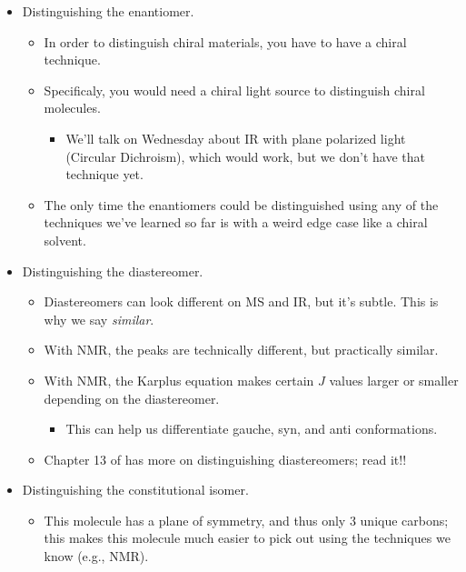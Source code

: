 \documentclass[../notes.tex]{subfiles}
\begin{document}
\begin{itemize}
\begin{itemize}
        \item Distinguishing the enantiomer.
        \begin{itemize}
            \item In order to distinguish chiral materials, you have to have a chiral technique.
            \item Specificaly, you would need a chiral light source to distinguish chiral molecules.
            \begin{itemize}
                \item We'll talk on Wednesday about IR with plane polarized light (Circular Dichroism), which would work, but we don't have that technique yet.
            \end{itemize}
            \item The only time the enantiomers could be distinguished using any of the techniques we've learned so far is with a weird edge case like a chiral solvent.
        \end{itemize}
        \item Distinguishing the diastereomer.
        \begin{itemize}
            \item Diastereomers can look different on MS and IR, but it's subtle. This is why we say \emph{similar}.
            \item With  NMR, the peaks are technically different, but practically similar.
            \item With  NMR, the Karplus equation makes certain $J$ values larger or smaller depending on the diastereomer.
            \begin{itemize}
                \item This can help us differentiate gauche, syn, and anti conformations.
            \end{itemize}
            \item Chapter 13 of \textcite{bib:Clayden} has more on distinguishing diastereomers; read it!!
        \end{itemize}
        \item Distinguishing the constitutional isomer.
        \begin{itemize}
            \item This molecule has a plane of symmetry, and thus only 3 unique carbons; this makes this molecule much easier to pick out using the techniques we know (e.g.,  NMR).
        \end{itemize}
    \end{itemize}

\end{itemize}
\end{document}
